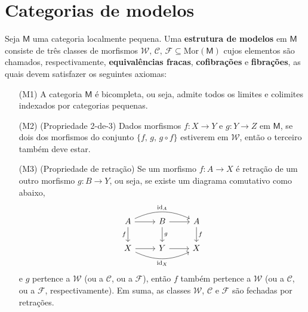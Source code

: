 \section{Categorias de modelos}

\begin{defin}\label{defin:estrutura_de_modelos}
  Seja $\mathsf{M}$ uma categoria localmente pequena.
  Uma \textbf{estrutura de modelos} em $\mathsf{M}$ consiste de três classes de morfismos $\mathcal{W},\, \mathcal{C},\, \mathcal{F} \subseteq \mathrm{Mor}(\mathsf{M})$ cujos elementos são chamados, respectivamente, \textbf{equivalências fracas}, \textbf{cofibrações} e \textbf{fibrações}, as quais devem satisfazer os seguintes axiomas:
  \begin{enumerate}
  \item[(M1)] A categoria $\mathsf{M}$ é bicompleta, ou seja, admite todos os limites e colimites indexados por categorias pequenas.
    
  \item[(M2)] (Propriedade 2-de-3) Dados morfismos $f: X \to Y$ e $g: Y \to Z$ em $\mathsf{M}$, se dois dos morfismos do conjunto $\{f,\,g,\, g \circ f\}$ estiverem em $\mathcal{W}$, então o terceiro também deve estar.
    
  \item[(M3)] (Propriedade de retração) Se um morfismo $f: A \to X$ é retração de um outro morfismo $g: B \to Y$, ou seja, se existe um diagrama comutativo como abaixo,
    \begin{equation}\label{eq:diagrama_axioma_de_retracao}
      \begin{tikzcd}
        A
        \arrow[r]
        \arrow[d, "f" swap]
        \arrow[rr, bend left=25, "\id_{A}"]
        & B
        \arrow[r]
        \arrow[d, "g"]
        & A
        \arrow[d, "f"]
        \\ X
        \arrow[r]
        \arrow[rr, bend right=25, "\id_{X}" swap]
        & Y
        \arrow[r]
        & X
      \end{tikzcd}
    \end{equation}
    e $g$ pertence a $\mathcal{W}$ (ou a $\mathcal{C}$, ou a $\mathcal{F}$), então $f$ também pertence a $\mathcal{W}$ (ou a $\mathcal{C}$, ou a $\mathcal{F}$, respectivamente).
    Em suma, as classes $\mathcal{W}$, $\mathcal{C}$ e $\mathcal{F}$ são fechadas por retrações.
    

\end{enumerate}
\end{defin}
